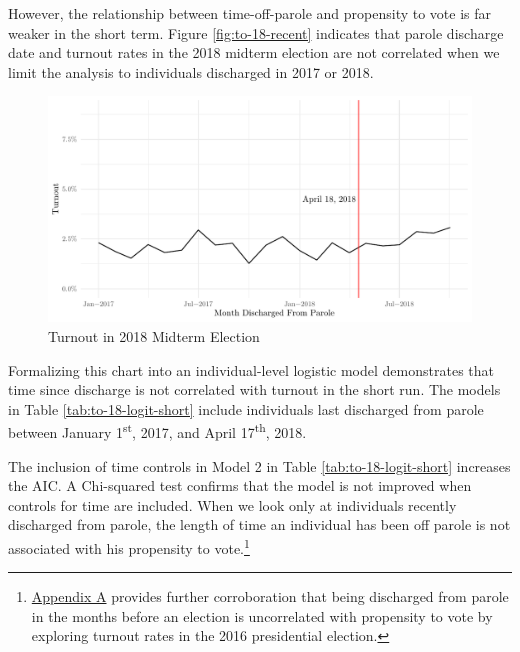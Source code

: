 \documentclass[12pt,]{article}
\let\rmarkdownfootnote\footnote%
\def\footnote{\protect\rmarkdownfootnote}
\begin{document}
However, the relationship between time-off-parole and propensity to vote is far weaker in the short term. Figure \ref{fig:to-18-recent} indicates that parole discharge date and turnout rates in the 2018 midterm election are not correlated when we limit the analysis to individuals discharged in 2017 or 2018.

\begin{figure}[H]

{\centering \includegraphics{felony_disenfranchisement_nys_files/figure-latex/to-18-recent-chart-1} 

}

\caption{\label{fig:to-18-recent}Turnout in 2018 Midterm Election}\label{fig:to-18-recent-chart}
\end{figure}

Formalizing this chart into an individual-level logistic model demonstrates that time since discharge is not correlated with turnout in the short run. The models in Table \ref{tab:to-18-logit-short} include individuals last discharged from parole between January 1\textsuperscript{st}, 2017, and April 17\textsuperscript{th}, 2018.



The inclusion of time controls in Model 2 in Table \ref{tab:to-18-logit-short} increases the AIC. A Chi-squared test confirms that the model is not improved when controls for time are included. When we look only at individuals recently discharged from parole, the length of time an individual has been off parole is not associated with his propensity to vote.\footnote{\protect\hyperlink{appendix-a}{Appendix A} provides further corroboration that being discharged from parole in the months before an election is uncorrelated with propensity to vote by exploring turnout rates in the 2016 presidential election.}
\end{document}
